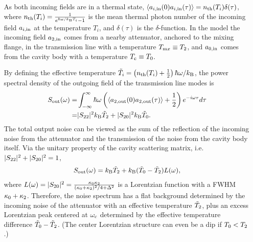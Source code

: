 As both incoming fields are in a thermal state, $\langle a_{i,\rm in}(0) a_{i,\rm in}(\tau) \rangle = n_{\rm th}(T_i) \delta(\tau)$, where $n_{\rm th}(T_i) = \frac{1}{e^{\hbar\omega/k_{\rm B}T_i} - 1}$ is the mean thermal photon number 
of the incoming field $a_{i,\rm in}$ at the temperature $T_i$, and 
$\delta(\tau)$ is the $\delta$-function. In the model the incoming field 
$a_{\rm 2,in}$ comes from a nearby attenuator, anchored to the mixing flange, 
in the transmission line 
with a temperature $T_{\text mx} \equiv T_{\rm 2}$, and $a_{\rm 0,in}$ comes 
from the cavity body with a temperature $T_{\text c} \equiv T_{\rm 0}$.

By defining the effective temperature $\Tilde{T}_i = \left( n_{\rm th}(T_i) + \frac{1}{2} \right) \hbar\omega/k_{\rm B}$,
the power spectral density of the outgoing field of the transmission line 
modes is
\begin{equation}
\label{eq:spectrum_relation}
\begin{aligned}
    S_{\rm out}(\omega) 
    =& \int_{-\infty}^{\infty} \hbar\omega \left(\langle a_{2,\rm out}(0) a_{2,\rm out}(\tau) \rangle + \frac{1}{2} \right) e^{-i\omega\tau} d\tau \\
    =& |S_{\rm 22}|^2 k_{\rm B} \Tilde{T}_2 + |S_{\rm 20}|^2 k_{\rm B} \Tilde{T}_0.
\end{aligned}
\end{equation}
The total output noise can be viewed as the sum of the reflection of the 
incoming noise from the attenuator and the transmission of the noise from the 
cavity body itself.
Via the unitary property of 
the cavity scattering matrix, i.e. $|S_{\rm 22}|^2+|S_{\rm 20}|^2=1$,
\begin{equation}
\label{eq:spectrum_relation_Lorentz}
\begin{aligned}
    S_{\rm out}(\omega) =  k_{\rm B} \Tilde{T}_2 + k_{\rm B} (\Tilde{T}_0 - \Tilde{T}_2) L(\omega),
\end{aligned}
\end{equation}
where $L(\omega) = |S_{\rm 20}|^2 = \frac {\kappa_0 \kappa_{\rm 2}}  {(\kappa_0+\kappa_{\rm 2})^2/4 + \Delta^2}$ is a Lorentzian function with a FWHM 
$\kappa_0+\kappa_{\rm 2}$. Therefore, the noise spectrum has a flat background
 determined by the incoming noise of the attenuator with an effective 
temperature $\Tilde{T}_{\rm 2}$, plus an excess Lorentzian peak centered at 
$\omega_{\rm c}$ determined by the effective temperature difference 
$\Tilde{T}_{\rm 0} - \Tilde{T}_{\rm 2}$. (The center Lorentzian structure 
can even be a dip if ${T}_{\rm 0} < {T}_{\rm 2}$.)

